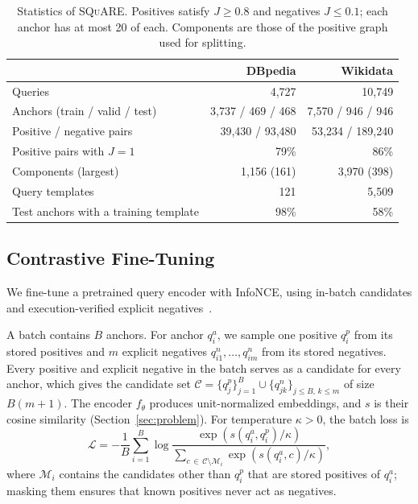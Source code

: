 \documentclass[runningheads]{llncs}
\newcommand{\squareds}{\textsc{SQuARE}}
\begin{document}
\begin{table}[t]
\centering
\caption{Statistics of \squareds{}. Positives satisfy $J \geq 0.8$ and
negatives $J \leq 0.1$; each anchor has at most 20 of each. Components are
those of the positive graph used for splitting.}
\label{tab:dataset_square}
\small
\setlength{\tabcolsep}{6pt}
\renewcommand{\arraystretch}{1.1}
\begin{tabular}{lrr}
\toprule
& \textbf{DBpedia} & \textbf{Wikidata} \\
\midrule
Queries & 4{,}727 & 10{,}749 \\
Anchors (train / valid / test) & 3{,}737 / 469 / 468 & 7{,}570 / 946 / 946 \\
Positive / negative pairs & 39{,}430 / 93{,}480 & 53{,}234 / 189{,}240 \\
Positive pairs with $J = 1$ & 79\% & 86\% \\
Components (largest) & 1{,}156 (161) & 3{,}970 (398) \\
Query templates & 121 & 5{,}509 \\
Test anchors with a training template & 98\% & 58\% \\
\bottomrule
\end{tabular}
\end{table}

\FloatBarrier
\subsection{Contrastive Fine-Tuning}
\label{sec:objective}

We fine-tune a pretrained query encoder with InfoNCE, using in-batch
candidates and execution-verified explicit
negatives~\cite{oord2018cpc,karpukhin2020dpr}.

A batch contains $B$ anchors. For anchor $q_i^a$, we sample one positive
$q_i^p$ from its stored positives and $m$ explicit negatives
$q_{i1}^n,\dots,q_{im}^n$ from its stored negatives. Every positive and
explicit negative in the batch serves as a candidate for every anchor, which
gives the candidate set
$\mathcal{C}=\{q_j^p\}_{j=1}^{B}\cup\{q_{jk}^n\}_{j\leq B,\,k\leq m}$ of size
$B(m+1)$. The encoder $f_\theta$ produces unit-normalized embeddings, and $s$
is their cosine similarity (Section~\ref{sec:problem}). For temperature
$\kappa>0$, the batch loss is
\begin{equation}
\mathcal{L}
=
-\frac{1}{B}\sum_{i=1}^{B}
\log
\frac{\exp\!\left(s(q_i^a,q_i^p)/\kappa\right)}
{\sum_{c\,\in\,\mathcal{C}\setminus\mathcal{M}_i}\exp\!\left(s(q_i^a,c)/\kappa\right)},
\label{eq:loss}
\end{equation}
where $\mathcal{M}_i$ contains the candidates other than $q_i^p$ that are
stored positives of $q_i^a$; masking them ensures that known positives never
act as negatives.
\end{document}
